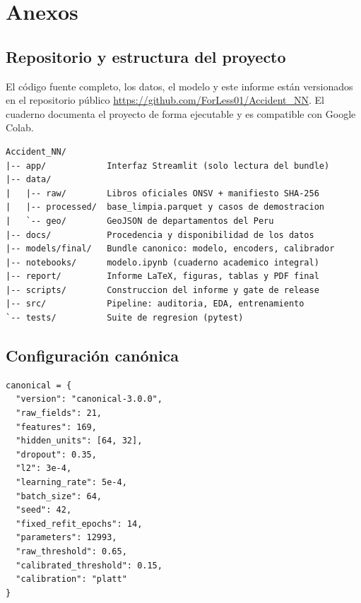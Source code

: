 \section{Anexos}\label{sec:anexos}

\subsection{Repositorio y estructura del proyecto}
El código fuente completo, los datos, el modelo y este informe están versionados en el repositorio público \url{https://github.com/ForLess01/Accident_NN}. El cuaderno  documenta el proyecto de forma ejecutable y es compatible con Google Colab.

\begin{lstlisting}[language={}, numbers=none]
Accident_NN/
|-- app/            Interfaz Streamlit (solo lectura del bundle)
|-- data/
|   |-- raw/        Libros oficiales ONSV + manifiesto SHA-256
|   |-- processed/  base_limpia.parquet y casos de demostracion
|   `-- geo/        GeoJSON de departamentos del Peru
|-- docs/           Procedencia y disponibilidad de los datos
|-- models/final/   Bundle canonico: modelo, encoders, calibrador
|-- notebooks/      modelo.ipynb (cuaderno academico integral)
|-- report/         Informe LaTeX, figuras, tablas y PDF final
|-- scripts/        Construccion del informe y gate de release
|-- src/            Pipeline: auditoria, EDA, entrenamiento
`-- tests/          Suite de regresion (pytest)
\end{lstlisting}

\subsection{Configuración canónica}
\begin{lstlisting}
canonical = {
  "version": "canonical-3.0.0",
  "raw_fields": 21,
  "features": 169,
  "hidden_units": [64, 32],
  "dropout": 0.35,
  "l2": 3e-4,
  "learning_rate": 5e-4,
  "batch_size": 64,
  "seed": 42,
  "fixed_refit_epochs": 14,
  "parameters": 12993,
  "raw_threshold": 0.65,
  "calibrated_threshold": 0.15,
  "calibration": "platt"
}
\end{lstlisting}

